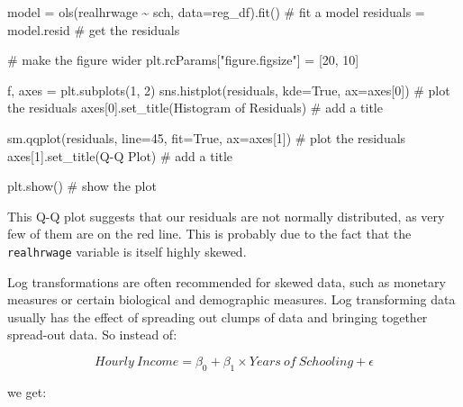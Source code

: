 \documentclass[
  letterpaper,
  DIV=11,
  numbers=noendperiod]{scrreprt}
\newenvironment{Shaded}{\begin{snugshade}}{\end{snugshade}}
\newcommand{\CommentTok}[1]{\textcolor[rgb]{0.37,0.37,0.37}{#1}}
\newcommand{\DecValTok}[1]{\textcolor[rgb]{0.68,0.00,0.00}{#1}}
\newcommand{\NormalTok}[1]{\textcolor[rgb]{0.00,0.23,0.31}{#1}}
\newcommand{\OperatorTok}[1]{\textcolor[rgb]{0.37,0.37,0.37}{#1}}
\newcommand{\StringTok}[1]{\textcolor[rgb]{0.13,0.47,0.30}{#1}}
\newcommand{\VariableTok}[1]{\textcolor[rgb]{0.07,0.07,0.07}{#1}}
\begin{document}
\begin{Shaded}
\begin{Highlighting}[]
\NormalTok{model }\OperatorTok{=}\NormalTok{ ols(}\StringTok{\textquotesingle{}realhrwage \textasciitilde{}  sch\textquotesingle{}}\NormalTok{, data}\OperatorTok{=}\NormalTok{reg\_df).fit()  }\CommentTok{\# fit a model}
\NormalTok{residuals }\OperatorTok{=}\NormalTok{ model.resid }\CommentTok{\# get the residuals}

\CommentTok{\# make the figure wider}
\NormalTok{plt.rcParams[}\StringTok{"figure.figsize"}\NormalTok{] }\OperatorTok{=}\NormalTok{ [}\DecValTok{20}\NormalTok{, }\DecValTok{10}\NormalTok{]}

\NormalTok{f, axes }\OperatorTok{=}\NormalTok{ plt.subplots(}\DecValTok{1}\NormalTok{, }\DecValTok{2}\NormalTok{)}
\NormalTok{sns.histplot(residuals, kde}\OperatorTok{=}\VariableTok{True}\NormalTok{, ax}\OperatorTok{=}\NormalTok{axes[}\DecValTok{0}\NormalTok{]) }\CommentTok{\# plot the residuals}
\NormalTok{axes[}\DecValTok{0}\NormalTok{].set\_title(}\StringTok{\textquotesingle{}Histogram of Residuals\textquotesingle{}}\NormalTok{) }\CommentTok{\# add a title}

\NormalTok{sm.qqplot(residuals, line}\OperatorTok{=}\StringTok{\textquotesingle{}45\textquotesingle{}}\NormalTok{, fit}\OperatorTok{=}\VariableTok{True}\NormalTok{,  ax}\OperatorTok{=}\NormalTok{axes[}\DecValTok{1}\NormalTok{]) }\CommentTok{\# plot the residuals}
\NormalTok{axes[}\DecValTok{1}\NormalTok{].set\_title(}\StringTok{\textquotesingle{}Q{-}Q Plot\textquotesingle{}}\NormalTok{) }\CommentTok{\# add a title}

\NormalTok{plt.show() }\CommentTok{\# show the plot}
\end{Highlighting}
\end{Shaded}

This Q-Q plot suggests that our residuals are not normally distributed,
as very few of them are on the red line. This is probably due to the
fact that the \texttt{realhrwage} variable is itself highly skewed.

Log transformations are often recommended for skewed data, such as
monetary measures or certain biological and demographic measures. Log
transforming data usually has the effect of spreading out clumps of data
and bringing together spread-out data. So instead of:

\[Hourly\ Income= \beta_0 + \beta_1 \times Years\ of\ Schooling +\epsilon \]

we get:
\end{document}
